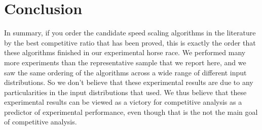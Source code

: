 \documentclass[11pt]{article}
\begin{document}
\section{Conclusion}


In summary, if you order the 
candidate speed scaling algorithms in the 
literature by the best competitive ratio
that has been proved, this is exactly the order that these
algorithms finished in our experimental horse race.
We performed many more experiments than the 
representative sample that we report here,
and we saw the same ordering of the algorithms
across a wide range of different input distributions.
So we don't believe that these experimental results
are due to any particularities in the input distributions that used.
We thus believe that these experimental results 
can be viewed as a victory for competitive analysis as
a predictor of experimental performance, even though that
is the not the main goal of competitive analysis.








\end{document}

